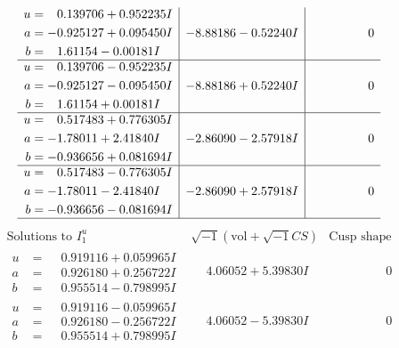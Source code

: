 \documentclass[1p]{elsarticle_modified}
\theoremstyle{definition}
\newcommand{\I}{\sqrt{-1}}
\begin{document}
$$\begin{array}{c|c|c}
\begin{aligned}
u &= \phantom{-}0.139706 + 0.952235 I \\
a &= -0.925127 + 0.095450 I \\
b &= \phantom{-}1.61154 - 0.00181 I\end{aligned}
 & -8.88186 - 0.52240 I & \phantom{-0.000000 } 0 \\ \hline\begin{aligned}
u &= \phantom{-}0.139706 - 0.952235 I \\
a &= -0.925127 - 0.095450 I \\
b &= \phantom{-}1.61154 + 0.00181 I\end{aligned}
 & -8.88186 + 0.52240 I & \phantom{-0.000000 } 0 \\ \hline\begin{aligned}
u &= \phantom{-}0.517483 + 0.776305 I \\
a &= -1.78011 + 2.41840 I \\
b &= -0.936656 + 0.081694 I\end{aligned}
 & -2.86090 - 2.57918 I & \phantom{-0.000000 } 0 \\ \hline\begin{aligned}
u &= \phantom{-}0.517483 - 0.776305 I \\
a &= -1.78011 - 2.41840 I \\
b &= -0.936656 - 0.081694 I\end{aligned}
 & -2.86090 + 2.57918 I & \phantom{-0.000000 } 0\\
 \hline 
 \end{array}$$\newpage$$\begin{array}{c|c|c}  
\text{Solutions to }I^u_{1}& \I (\text{vol} + \sqrt{-1}CS) & \text{Cusp shape}\\
 \hline 
\begin{aligned}
u &= \phantom{-}0.919116 + 0.059965 I \\
a &= \phantom{-}0.926180 + 0.256722 I \\
b &= \phantom{-}0.955514 - 0.798995 I\end{aligned}
 & \phantom{-}4.06052 + 5.39830 I & \phantom{-0.000000 } 0 \\ \hline\begin{aligned}
u &= \phantom{-}0.919116 - 0.059965 I \\
a &= \phantom{-}0.926180 - 0.256722 I \\
b &= \phantom{-}0.955514 + 0.798995 I\end{aligned}
 & \phantom{-}4.06052 - 5.39830 I & \phantom{-0.000000 } 0 \\ \hline\begin{aligned}

\end{aligned}
\end{array}$$
\end{document}

